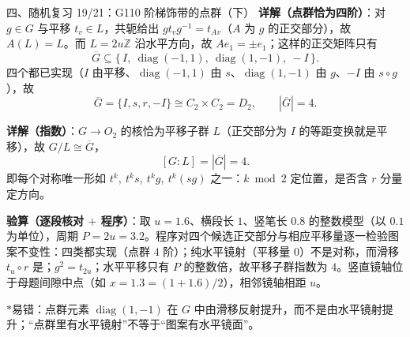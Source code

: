 \documentclass[aspectratio=169,10pt,fontset=none]{ctexbeamer}
\newcommand{\key}[1]{\textcolor{ink}{\bfseries #1}}
\newcommand{\starpt}{\textcolor{accent}{\bfseries$\ast$}}
\begin{document}
\begin{frame}[t]{四、随机复习 19/21：G110 阶梯饰带的点群（下）}
\scriptsize
\key{详解（点群恰为四阶）}：对 $g\in G$ 与平移 $t_v\in L$，共轭给出 $g t_v g^{-1}=t_{Av}$（$A$ 为 $g$ 的正交部分），故 $A(L)=L$。而 $L=2u\mathbb Z$ 沿水平方向，故 $A e_1=\pm e_1$；这样的正交矩阵只有
\[ \overline G\subseteq\{\,I,\ \operatorname{diag}(-1,1),\ \operatorname{diag}(1,-1),\ -I\,\}. \]
四个都已实现（$I$ 由平移、$\operatorname{diag}(-1,1)$ 由 $s$、$\operatorname{diag}(1,-1)$ 由 $g$、$-I$ 由 $s\circ g$），故
\[ \overline G=\{I,s,r,-I\}\cong C_2\times C_2=D_2,\qquad |\overline G|=4. \]

\key{详解（指数）}：$G\to O_2$ 的核恰为平移子群 $L$（正交部分为 $I$ 的等距变换就是平移），故 $G/L\cong\overline G$，
\[ [G:L]=|\overline G|=4. \]
即每个对称唯一形如 $t^k,\ t^ks,\ t^kg,\ t^k(sg)$ 之一：$k\bmod2$ 定位置，是否含 $r$ 分量定方向。

\key{验算（逐段核对 $+$ 程序）}：取 $u=1.6$、横段长 $1$、竖笔长 $0.8$ 的整数模型（以 $0.1$ 为单位），周期 $P=2u=3.2$。程序对四个候选正交部分与相应平移量逐一检验图案不变性：四类都实现（点群 $4$ 阶）；纯水平镜射（平移量 $0$）不是对称，而滑移 $t_u\circ r$ 是；$g^2=t_{2u}$；水平平移只有 $P$ 的整数倍，故平移子群指数为 $4$。竖直镜轴位于母题间隙中点（如 $x=1.3=(1+1.6)/2$），相邻镜轴相距 $u$。

\starpt 易错：点群元素 $\operatorname{diag}(1,-1)$ 在 $G$ 中由滑移反射提升，而不是由水平镜射提升；“点群里有水平镜射”不等于“图案有水平镜面”。
\end{frame}
\end{document}
